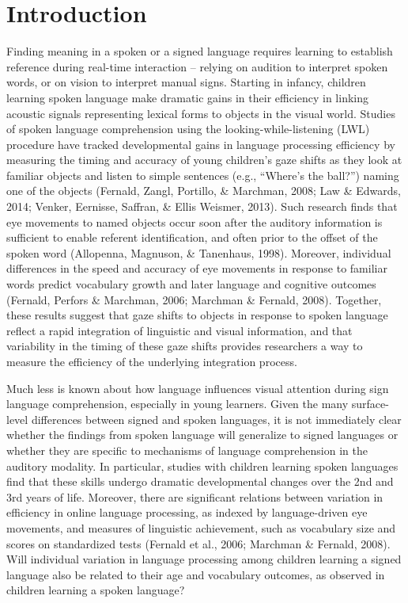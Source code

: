 \documentclass[oneside]{report}
\begin{document}
\section{Introduction}\label{introduction-1}

Finding meaning in a spoken or a signed language requires learning to
establish reference during real-time interaction -- relying on audition
to interpret spoken words, or on vision to interpret manual signs.
Starting in infancy, children learning spoken language make dramatic
gains in their efficiency in linking acoustic signals representing
lexical forms to objects in the visual world. Studies of spoken language
comprehension using the looking-while-listening (LWL) procedure have
tracked developmental gains in language processing efficiency by
measuring the timing and accuracy of young children's gaze shifts as
they look at familiar objects and listen to simple sentences (e.g.,
``Where's the ball?'') naming one of the objects (Fernald, Zangl,
Portillo, \& Marchman, 2008; Law \& Edwards, 2014; Venker, Eernisse,
Saffran, \& Ellis Weismer, 2013). Such research finds that eye movements
to named objects occur soon after the auditory information is sufficient
to enable referent identification, and often prior to the offset of the
spoken word (Allopenna, Magnuson, \& Tanenhaus, 1998). Moreover,
individual differences in the speed and accuracy of eye movements in
response to familiar words predict vocabulary growth and later language
and cognitive outcomes (Fernald, Perfors \& Marchman, 2006; Marchman \&
Fernald, 2008). Together, these results suggest that gaze shifts to
objects in response to spoken language reflect a rapid integration of
linguistic and visual information, and that variability in the timing of
these gaze shifts provides researchers a way to measure the efficiency
of the underlying integration process.

Much less is known about how language influences visual attention during
sign language comprehension, especially in young learners. Given the
many surface-level differences between signed and spoken languages, it
is not immediately clear whether the findings from spoken language will
generalize to signed languages or whether they are specific to
mechanisms of language comprehension in the auditory modality. In
particular, studies with children learning spoken languages find that
these skills undergo dramatic developmental changes over the 2nd and 3rd
years of life. Moreover, there are significant relations between
variation in efficiency in online language processing, as indexed by
language-driven eye movements, and measures of linguistic achievement,
such as vocabulary size and scores on standardized tests (Fernald et
al., 2006; Marchman \& Fernald, 2008). Will individual variation in
language processing among children learning a signed language also be
related to their age and vocabulary outcomes, as observed in children
learning a spoken language?
\end{document}
